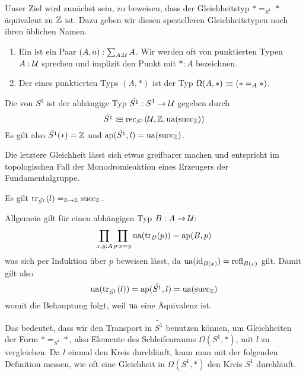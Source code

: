 Unser Ziel wird zunächst sein, zu beweisen, dass der Gleichheitstyp $\ast=_{S^1}\ast$ äquivalent zu $\mathbb{Z}$ ist.
Dazu geben wir diesen spezielleren Gleichheitstypen noch ihren üblichen Namen.

\begin{definition}
  \begin{enumerate}
  \item Ein  ist ein Paar $(A,a):\sum_{A:\mathcal{U}}A$. Wir werden oft von punktierten Typen $A:\mathcal{U}$ sprechen und implizit den Punkt mit $\ast:A$ bezeichnen.
  \item Der \index{$\Omega$} eines punktierten Typs $(A,\ast)$ ist der Typ $\Omega(A,\ast)\vcentcolon\mspace{-1.2mu}\equiv (\ast=_A\ast)$.
  \end{enumerate}
\end{definition}

\begin{definition}
  Die  von $S^1$ ist der abhängige Typ $\tilde{S^1}:S^1\to\mathcal{U}$ gegeben durch
  \[
    \tilde{S^1}\vcentcolon\mspace{-1.2mu}\equiv \mathrm{rec}_{S^1}(\mathcal{U}, \mathbb{Z}, \mathrm{ua}({\mathrm{succ}}_{\mathbb{Z}}))
  \]
  Es gilt also $\tilde{S^1}(\ast)=\mathbb{Z}$ und $\mathrm{ap}(\tilde{S^1},l)=\mathrm{ua}(\mathrm{succ}_{\mathbb{Z}})$.
\end{definition}

Die letztere Gleichheit lässt sich etwas greifbarer machen und entspricht im topologischen Fall der Monodromieaktion eines Erzeugers der Fundamentalgruppe.


\begin{bemerkung}
  Es gilt $\mathrm{tr}_{\tilde{S^1}}(l)=_{\mathbb{Z}\to\mathbb{Z}}\mathrm{succ}_{\mathbb{Z}}$.
\end{bemerkung}
\begin{beweis}
  Allgemein gilt für einen abhängigen Typ $B:A\to\mathcal{U}$:
  \[
    \prod_{x,y:A}\prod_{p:x=y}\mathrm{ua}(\mathrm{tr}_B(p))=\mathrm{ap}(B,p)
  \]
  was sich per Induktion über $p$ beweisen lässt, da $\mathrm{ua}(\mathrm{id}_{B(x)})=\mathrm{refl}_{B(x)}$ gilt.
  Damit gilt also
  \[
    \mathrm{ua}(\mathrm{tr}_{\tilde{S^1}}(l))=\mathrm{ap}(\tilde{S^1},l)=\mathrm{ua}(\mathrm{succ}_{\mathbb{Z}})
  \]
  womit die Behauptung folgt, weil $\mathrm{ua}$ eine Äquivalenz ist.
\end{beweis}

Das bedeutet, dass wir den Transport in $\tilde{S^1}$ benutzen können, um Gleichheiten der Form $\ast=_{S^1}\ast$, also Elemente des Schleifenraums $\Omega(S^1,\ast)$, mit $l$ zu vergleichen.
Da $l$ einmal den Kreis durchläuft, kann man mit der folgenden Definition messen, wie oft eine Gleichheit in $\Omega(S^1,\ast)$ den Kreis $S^1$ durchläuft.

